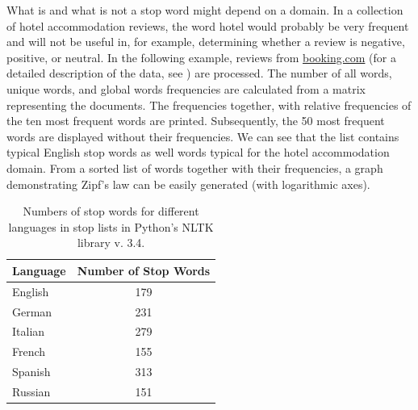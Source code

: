 \documentclass[11pt,openany,executivepaper]{book}
\begin{document}
What is and what is not a stop word might depend on a domain. In a collection of hotel accommodation reviews, the word hotel would probably be very frequent and will not be useful in, for example, determining whether a review is negative, positive, or neutral. In the following example, reviews from \href{http://booking.com}{booking.com} (for a detailed description of the data, see \cite{295}) are processed. The number of all words, unique words, and global words frequencies are calculated from a matrix representing the documents. The frequencies together, with relative frequencies of the ten most frequent words are printed. Subsequently, the 50 most frequent words are displayed without their frequencies. We can see that the list contains typical English stop words as well words typical for the hotel accommodation domain. From a sorted list of words together with their frequencies, a graph demonstrating Zipf's law can be easily generated (with logarithmic axes).

\begin{table}[ht!]
\begin{center}
\caption{Numbers of stop words for different languages in stop lists in Python's NLTK library v. 3.4.}
\begin{tabular}{l|c}
\hline
Language & Number of Stop Words \\
\hline
English & 179 \\
German & 231 \\
Italian & 279 \\
French & 155 \\
Spanish & 313 \\
Russian & 151 \\
\hline
\end{tabular}
\end{center}
\end{table}
\vspace{12pt}
\end{document}
